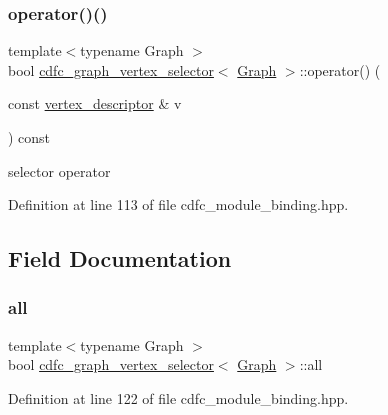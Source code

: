 \subsubsection{\texorpdfstring{operator()()}{operator()()}}
{\footnotesize\ttfamily template$<$typename Graph $>$ \\
bool \hyperlink{structcdfc__graph__vertex__selector}{cdfc\+\_\+graph\+\_\+vertex\+\_\+selector}$<$ \hyperlink{structGraph}{Graph} $>$\+::operator() (\begin{DoxyParamCaption}\item[{const \hyperlink{structcdfc__graph__vertex__selector_a4cafbcfc2a2a46718e5a8330b56398fb}{vertex\+\_\+descriptor} \&}]{v }\end{DoxyParamCaption}) const\hspace{0.3cm}{\ttfamily [inline]}}



selector operator 



Definition at line 113 of file cdfc\+\_\+module\+\_\+binding.\+hpp.



\subsection{Field Documentation}
\mbox{\label{structcdfc__graph__vertex__selector_a2769895af504c2dbe53186749ba1d8c6}} 
\subsubsection{\texorpdfstring{all}{all}}
{\footnotesize\ttfamily template$<$typename Graph $>$ \\
bool \hyperlink{structcdfc__graph__vertex__selector}{cdfc\+\_\+graph\+\_\+vertex\+\_\+selector}$<$ \hyperlink{structGraph}{Graph} $>$\+::all\hspace{0.3cm}{\ttfamily [private]}}



Definition at line 122 of file cdfc\+\_\+module\+\_\+binding.\+hpp.

\mbox{\label{structcdfc__graph__vertex__selector_ae62454b1394b8795f9dd86f30b06ebda}} 
